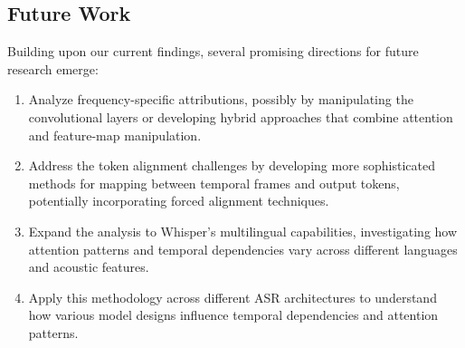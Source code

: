 \documentclass[../report.tex]{subfiles}
\begin{document}
    
    \subsection{Future Work}
    \label{sec:conclusions:future_work}
    Building upon our current findings, several promising directions for future research emerge:

    \begin{enumerate}
        
        \item Analyze frequency-specific attributions, possibly by manipulating the convolutional layers or developing hybrid approaches that combine attention and feature-map manipulation.
        
        \item Address the token alignment challenges by developing more sophisticated methods for mapping between temporal frames and output tokens, potentially incorporating forced alignment techniques.
        
        \item Expand the analysis to Whisper's multilingual capabilities, investigating how attention patterns and temporal dependencies vary across different languages and acoustic features.
        
        \item Apply this methodology across different ASR architectures to understand how various model designs influence temporal dependencies and attention patterns.
    \end{enumerate}
\end{document}
